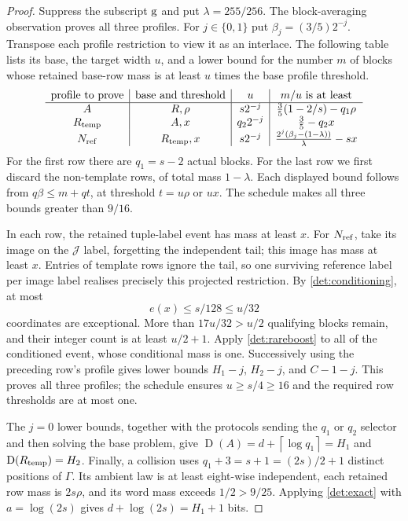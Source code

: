 \documentclass[11pt]{article} \usepackage[utf8]{inputenc}
\theoremstyle{plain} \newtheorem{theorem}{Theorem}[section]
\theoremstyle{definition} \newaliascnt{definition}{theorem}
\newcommand{\D}{\operatorname{D}}
\newcommand{\ceil}[1]{\left\lceil#1\right\rceil}
\begin{document}
\begin{proof}
Suppress the subscript $\rm g$ and put $\lambda=255/256$.
The block-averaging observation proves all three profiles.
For $j\in\{0,1\}$ put $\beta_j=(3/5)2^{-j}$.
Transpose each profile restriction to view it as an interlace. The following
table lists its base, the target width $u$, and a lower bound for the number
$m$ of blocks whose retained base-row mass is at least $u$ times the base
profile threshold.
\[
\begin{array}{c|c|c|c}
\text{profile to prove}&\text{base and threshold}&u&m/u\text{ is at least}\\ \hline
A&R,\rho&s2^{-j}&\frac35(1-2/s)-q_1\rho\\
R_{\rm temp}&A,x&q_2 2^{-j}&\frac35-q_2x\\
N_{\rm ref}&R_{\rm temp},x&s2^{-j}&
\frac{2^j(\beta_j-(1-\lambda))}{\lambda}-sx
\end{array}
\]
For the first row there are $q_1=s-2$ actual blocks. For the last row we
first discard the non-template rows, of total mass $1-\lambda$.
Each displayed bound follows from $q\beta\le m+qt$, at threshold
$t=u\rho$ or $ux$.
The schedule makes all three bounds greater than $9/16$.

In each row, the retained tuple-label event has mass at least $x$.
For $N_{\rm ref}$, take its image on the $\mathcal J$ label, forgetting the
independent tail; this image has mass at least $x$. Entries of template rows
ignore the tail, so one surviving reference label per image label realises
precisely this projected restriction. By \cref{det:conditioning}, at most
\[
e(x)\le s/128\le u/32
\]
coordinates are exceptional. More than $17u/32>u/2$ qualifying blocks remain,
and their integer count is at least $u/2+1$. Apply \cref{det:rareboost} to all
of the conditioned event, whose conditional mass is one. Successively using
the preceding row's profile gives lower bounds
$H_1-j$, $H_2-j$, and $C-1-j$. This proves all three profiles; the schedule
ensures $u\ge s/4\ge16$ and the required row thresholds are at most one.

The $j=0$ lower bounds, together with the protocols sending the $q_1$ or
$q_2$ selector and then solving the base problem, give
$\D(A)=d+\ceil{\log q_1}=H_1$ and $\D(R_{\rm temp})=H_2$.
Finally, a collision uses $q_1+3=s+1=(2s)/2+1$ distinct positions of
$\Gamma$. Its ambient law is at least eight-wise independent, each retained
row mass is $2s\rho$, and its word mass exceeds $1/2>9/25$.
Applying \cref{det:exact} with $a=\log(2s)$ gives $d+\log(2s)=H_1+1$ bits.
\end{proof}
\end{document}
